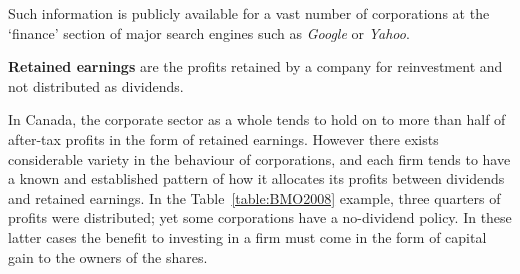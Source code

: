 Such information is publicly available for a vast number of corporations at
the `finance' section of major search engines such as \textit{Google} or \textit{Yahoo}.

\begin{DefBox}
\textbf{Retained earnings} are the profits retained by a company for reinvestment and not distributed as dividends.
\end{DefBox}

In Canada, the corporate sector as a whole tends to hold on to more than
half of after-tax profits in the form of retained earnings. However there
exists considerable variety in the behaviour of corporations, and each firm
tends to have a known and established pattern of how it allocates its profits
between dividends and retained earnings. In the Table~\ref{table:BMO2008}
example, three quarters of profits were distributed; yet some corporations
have a no-dividend policy. In these latter cases the benefit to investing in
a firm must come in the form of capital gain to the owners of the shares.